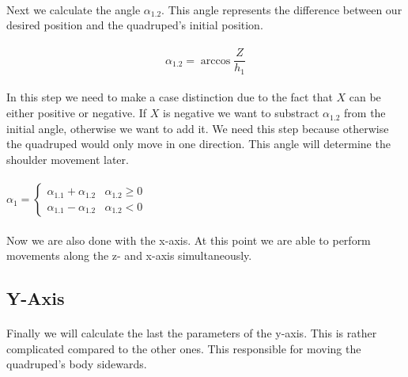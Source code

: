\documentclass{article}
\begin{document}
    \paragraph{}
    Next we calculate the angle $\alpha_{1.2}$. This angle represents the difference between our desired position and the quadruped's initial position. 

    \paragraph{}
    \begin{equation}
        \alpha_{1.2} = \arccos \frac{Z}{h_1}
    \end{equation}

    \paragraph{}
    In this step we need to make a case distinction due to the fact that $X$ can be either positive or negative. If $X$ is negative we want to substract $\alpha_{1.2}$ from the initial angle, otherwise we want to add it. We need this step because otherwise the quadruped would only move in one direction. This angle will determine the shoulder movement later.

    \paragraph{}
    $\alpha_1 = \left\{
    \begin{array}{ll}
    \alpha_{1.1} + \alpha_{1.2} & \alpha_{1.2} \ge 0 \\
    \alpha_{1.1} - \alpha_{1.2} & \alpha_{1.2} < 0
    \end{array}
    \right. $

    \paragraph{}
    Now we are also done with the x-axis. At this point we are able to perform movements along the z- and x-axis simultaneously.



    \pagebreak
    \subsection{Y-Axis}
    \paragraph{} %
    Finally we will calculate the last the parameters of the y-axis. This is rather complicated compared to the other ones. This responsible for moving the quadruped's body sidewards.
    
\end{document}
